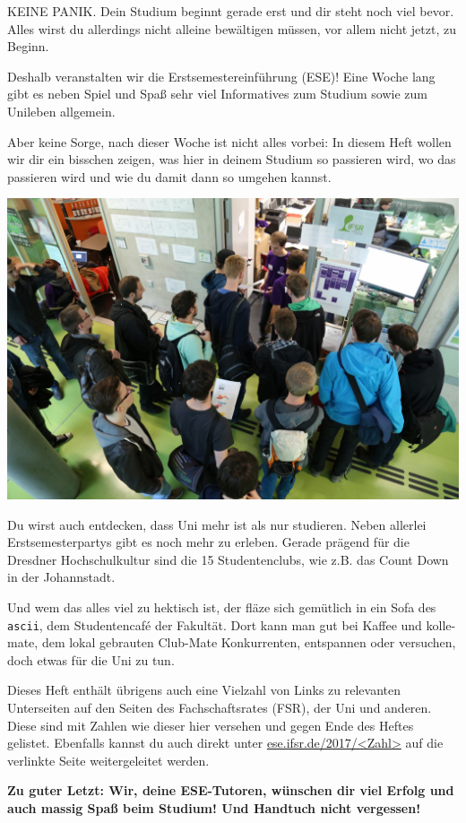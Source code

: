 
KEINE PANIK. 
Dein Studium beginnt gerade erst und dir steht noch viel bevor.
Alles wirst du allerdings nicht alleine bewältigen müssen, vor allem nicht jetzt, zu Beginn.

Deshalb veranstalten wir die Erstsemestereinführung (ESE)!
Eine Woche lang gibt es neben Spiel und Spaß sehr viel Informatives zum Studium sowie zum Unileben allgemein.

Aber keine Sorge, nach dieser Woche ist nicht alles vorbei: In diesem Heft wollen wir dir ein bisschen zeigen, was hier in deinem Studium so passieren wird, wo das passieren wird und wie du damit dann so umgehen kannst.

\begin{minipage}{.65\textwidth}
  \includegraphics[width=\textwidth]{img/ese2015/bueroansturm.jpg}
\end{minipage}%
\hspace*{.4cm}%
\begin{minipage}{.3\textwidth}
  \vspace*{1.5em}
  Du wirst auch entdecken, dass Uni mehr ist als nur studieren.
  Neben allerlei Erstsemesterpartys gibt es noch mehr zu erleben.
  Gerade prägend für die Dresdner Hochschulkultur sind die 15 Studentenclubs, wie z.B. das Count Down in der Johannstadt.\\[0.6em]
\end{minipage}

Und wem das alles viel zu hektisch ist, der fläze sich gemütlich in ein Sofa des \texttt{ascii}, dem Studentencafé der Fakultät. 
Dort kann man gut bei Kaffee und kolle-mate, dem lokal gebrauten Club-Mate Konkurrenten,  entspannen oder versuchen, doch etwas für die Uni zu tun.

Dieses Heft enthält übrigens auch eine Vielzahl von Links zu relevanten Unterseiten auf den Seiten des Fachschaftsrates (FSR), der Uni und anderen.
Diese sind mit Zahlen wie dieser hier  versehen und gegen Ende des Heftes gelistet. Ebenfalls kannst du auch direkt unter \url{ese.ifsr.de/2017/<Zahl>} auf die verlinkte Seite weitergeleitet werden.

\textbf{Zu guter Letzt: Wir, deine ESE-Tutoren, wünschen dir viel Erfolg und auch massig Spaß beim Studium! Und Handtuch nicht vergessen!}
